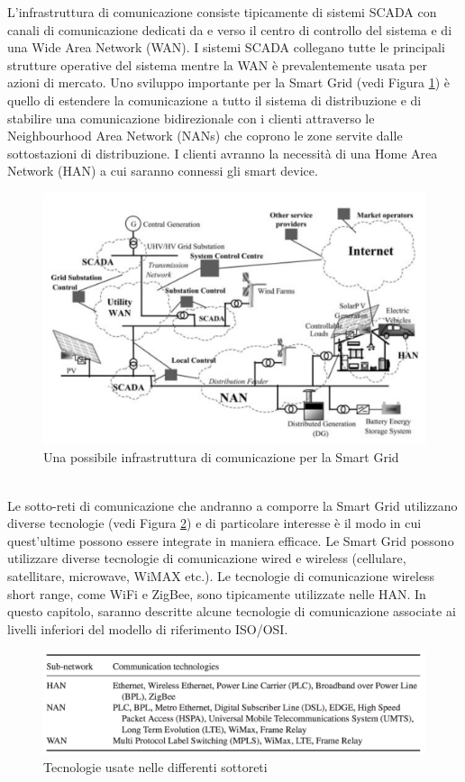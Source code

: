 L'infrastruttura di comunicazione consiste tipicamente di sistemi SCADA con canali di comunicazione dedicati da e verso il centro di controllo del sistema e di una Wide Area Network (WAN). I sistemi SCADA collegano tutte le principali strutture operative del sistema mentre la WAN è prevalentemente usata per azioni di mercato. Uno sviluppo importante per la Smart Grid (vedi Figura \ref{fig:cisg}) è quello di estendere la comunicazione a tutto il sistema di distribuzione e di stabilire una comunicazione bidirezionale con i clienti attraverso le Neighbourhood Area Network (NANs) che coprono le zone servite dalle sottostazioni di distribuzione. I clienti avranno la necessità di una Home Area Network (HAN) a cui saranno connessi gli smart device.
\begin{figure}[h]
	\centering
	\includegraphics[scale=0.310]{imgs/comm_inf_SG.png}
	\caption{Una possibile infrastruttura di comunicazione per la Smart Grid} \label{fig:cisg}
\end{figure}\\
Le sotto-reti di comunicazione che andranno a comporre la Smart Grid utilizzano diverse tecnologie (vedi Figura \ref{fig:th}) e di particolare interesse è il modo in cui quest'ultime possono essere integrate in maniera efficace. Le Smart Grid possono utilizzare diverse tecnologie di comunicazione wired e wireless (cellulare, satellitare, microwave, WiMAX etc.). Le tecnologie di comunicazione wireless short range, come WiFi e ZigBee,  sono tipicamente utilizzate nelle HAN.
In questo capitolo, saranno descritte alcune tecnologie di comunicazione associate ai livelli inferiori del modello di riferimento ISO/OSI.
\begin{figure}[h]
	\centering
	\includegraphics[scale=0.350]{imgs/tech.png}
	\caption{Tecnologie usate nelle differenti sottoreti} \label{fig:th}
\end{figure}

